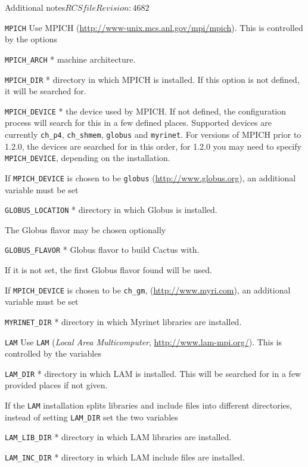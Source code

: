 \begin{cactuspart}{Additional notes}{$RCSfile$}{$Revision: 4682 $}
\begin{Lentry}
\item[\texttt{MPICH}]
Use MPICH (\url{http://www-unix.mcs.anl.gov/mpi/mpich}). This is controlled
by the options
  \begin{Lentry}
  \item [\texttt{MPICH\_ARCH}] * machine architecture.
  \item [\texttt{MPICH\_DIR} ] * directory in which MPICH is installed.
        If this option is not defined, it will be searched for.
  \item [\texttt{MPICH\_DEVICE}] * the device used by MPICH. If not
        defined, the configuration process will search for this in a
        few defined places.
        Supported devices are currently \texttt{ch\_p4}, \texttt{ch\_shmem},
        \texttt{globus} and \texttt{myrinet}.
        For versions of MPICH prior to 1.2.0, the devices are searched for
         in this order, for 1.2.0 you may need to specify \texttt{MPICH\_DEVICE},
        depending on the installation.
  \end{Lentry}

If \texttt{MPICH\_DEVICE} is chosen to be \texttt{globus}
(\url{http://www.globus.org}), an additional variable must be set
  \begin{Lentry}
  \item[\texttt{GLOBUS\_LOCATION}] * directory in which Globus is installed.
  \end{Lentry}
The Globus flavor may be chosen optionally
  \begin{Lentry}
  \item[\texttt{GLOBUS\_FLAVOR}] * Globus flavor to build Cactus with.
  \end{Lentry}
If it is not set, the first Globus flavor found will be used.

If \texttt{MPICH\_DEVICE} is chosen to be \texttt{ch\_gm},
(\url{http://www.myri.com}), an additional variable must be set
  \begin{Lentry}
  \item[\texttt{MYRINET\_DIR}] * directory in which Myrinet libraries are installed.
  \end{Lentry}

\item[\texttt{LAM}]
Use \texttt{LAM} (\textit{Local Area Multicomputer}, \url{http://www.lam-mpi.org/}).
This is controlled by the variables
  \begin{Lentry}
  \item[\texttt{LAM\_DIR} ] * directory in which LAM is installed. This
     will be searched for in a few provided places if not given.
  \end{Lentry}
If the \texttt{LAM} installation splits libraries and include files into different
directories, instead of setting \texttt{LAM\_DIR} set the two variables
  \begin{Lentry}
  \item[\texttt{LAM\_LIB\_DIR}] * directory in which LAM libraries are installed.
  \item[\texttt{LAM\_INC\_DIR}] * directory in which LAM include files are installed.
  \end{Lentry}



\end{Lentry}
\end{cactuspart}

